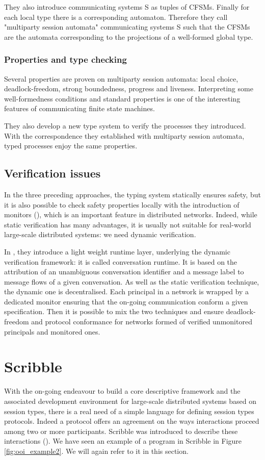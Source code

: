 \documentclass[a4paper,11pt,twoside]{report}
\begin{document}
They also introduce communicating systems S as tuples of CFSMs. Finally for each local type there is a corresponding automaton. Therefore they call "multiparty session automata" communicating systems S such that the CFSMs are the automata corresponding to the projections of a well-formed global type.



\subsubsection{Properties and type checking}
Several properties are proven on multiparty session automata: local choice, deadlock-freedom, strong boundedness, progress and liveness. Interpreting some well-formedness conditions and standard properties is one of the interesting features of communicating finite state machines.

They also develop a new type system to verify the processes they introduced. With the correspondence they established with multiparty session automata, typed processes enjoy the same properties.



\subsection{Verification issues}
In the three preceding approaches, the typing system statically ensures safety, but it is also possible to check safety properties locally with the introduction of monitors (\cite{bocchisafety}), which is an important feature in distributed networks. Indeed, while static verification has many advantages, it is usually not suitable for real-world large-scale distributed systems: we need dynamic verification.

In \cite{bocchisafety}, they introduce a light weight runtime layer, underlying the dynamic verification framework: it is called conversation runtime. It is based on the attribution of an unambiguous conversation identifier and a message label to message flows of a given conversation. As well as the static verification technique, the dynamic one is decentralised. Each principal in a network is wrapped by a dedicated monitor ensuring that the on-going communication conform a given specification. Then it is possible to mix the two techniques and ensure deadlock-freedom and protocol conformance for networks formed of verified unmonitored principals and monitored ones.



\section{Scribble}
With the on-going endeavour to build a core descriptive framework and the associated development environment for large-scale distributed systems based on session types, there is a real need of a simple language for defining session types protocols. Indeed a protocol offers an agreement on the ways interactions proceed among two or more participants. Scribble was introduced to describe these interactions (\cite{honda2011scribbling}). We have seen an example of a program in Scribble in Figure \ref{fig:ooi_example2}. We will again refer to it in this section.
\end{document}
